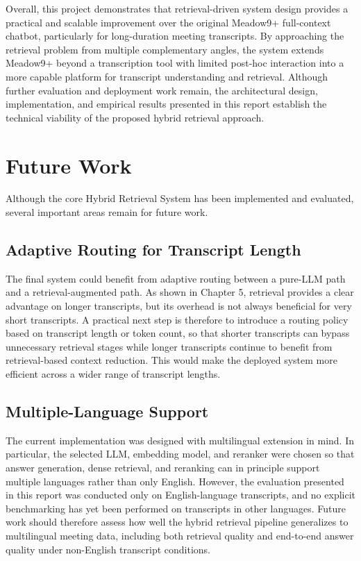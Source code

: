 Overall, this project demonstrates that retrieval-driven system design provides a practical and scalable improvement over the original Meadow9+ full-context chatbot, particularly for long-duration meeting transcripts. By approaching the retrieval problem from multiple complementary angles, the system extends Meadow9+ beyond a transcription tool with limited post-hoc interaction into a more capable platform for transcript understanding and retrieval. Although further evaluation and deployment work remain, the architectural design, implementation, and empirical results presented in this report establish the technical viability of the proposed hybrid retrieval approach.

\section{Future Work}
Although the core Hybrid Retrieval System has been implemented and evaluated, several important areas remain for future work.

\subsection{Adaptive Routing for Transcript Length}
The final system could benefit from adaptive routing between a pure-LLM path and a retrieval-augmented path. As shown in Chapter 5, retrieval provides a clear advantage on longer transcripts, but its overhead is not always beneficial for very short transcripts. A practical next step is therefore to introduce a routing policy based on transcript length or token count, so that shorter transcripts can bypass unnecessary retrieval stages while longer transcripts continue to benefit from retrieval-based context reduction. This would make the deployed system more efficient across a wider range of transcript lengths.

\subsection{Multiple-Language Support}
The current implementation was designed with multilingual extension in mind. In particular, the selected LLM, embedding model, and reranker were chosen so that answer generation, dense retrieval, and reranking can in principle support multiple languages rather than only English. However, the evaluation presented in this report was conducted only on English-language transcripts, and no explicit benchmarking has yet been performed on transcripts in other languages. Future work should therefore assess how well the hybrid retrieval pipeline generalizes to multilingual meeting data, including both retrieval quality and end-to-end answer quality under non-English transcript conditions.

